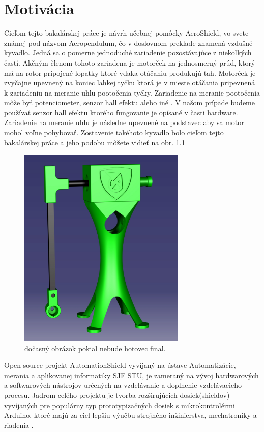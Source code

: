 \chapter{Motivácia}

Cieľom tejto bakalárskej práce je návrh učebnej pomôcky AeroShield, vo svete známej pod názvom Aeropendulum, čo v doslovnom preklade znamená vzdušné kyvadlo. Jedná sa o pomerne jednoduché zariadenie pozostávajúce z niekoľkých častí. Akčným členom tohoto zariadena je  motorček na jednosmerný prúd, ktorý má na rotor pripojené lopatky ktoré vďaka otáčaniu produkujú ťah. Motorček je zvyčajne upevnený na koniec ľahkej tyčku ktorá je v mieste otáčania pripevnená k zariadeniu na meranie uhlu pootočenia tyčky. Zariadenie na meranie pootočenia môže byť potenciometer, senzor hall efektu alebo iné \cite{senzor}. V našom prípade budeme používať senzor hall efektu ktorého fungovanie je opísané v časti hardware. Zariadenie na meranie uhlu je následne upevnené na podstavec aby sa motor mohol voľne pohybovať. Zostavenie takéhoto kyvadlo bolo cieľom tejto bakalárskej práce a jeho podobu môžete vidieť na obr. \ref{OBRAZOK 1.1}

\begin{figure}[!tbh]
\centering
\includegraphics[width=80mm]{obr/pendulum.png}
\caption{dočasný obrázok pokial nebude hotovec final.}\label{OBRAZOK 1.1}
\end{figure}

Open-source projekt AutomationShield vyvíjaný na ústave Automatizácie, merania a aplikovanej informatiky SJF STU, je zameraný na vývoj hardwarových a softwarových nástrojov určených na vzdelávanie a doplnenie vzdelávacieho procesu. Jadrom celého projektu je tvorba rozširujúcich dosiek(shieldov) vyvíjaných pre populárny typ prototypizačných dosiek s mikrokontrolérmi Arduino, ktoré majú za ciel lepšiu výučbu strojného inžinierstva, mechatroniky a riadenia \cite{Auto}.

